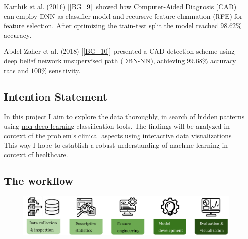 \documentclass[12pt]{article}
\numberwithin{equation}{section}
\begin{document}
\begin{flushleft}
Karthik et al. (2016) [\ref{BG_9}] showed how Computer-Aided Diagnosis (CAD) can employ DNN as classifier model and recursive feature elimination (RFE) for feature selection. After optimizing the train-test split the model reached $98.62 \%$ accuracy. 

Abdel-Zaher et al. (2018) [\ref{BG_10}] presented a CAD detection scheme using deep belief network unsupervised path (DBN-NN), achieving $99.68 \%$ accuracy rate and $100 \%$ sensitivity.


\subsection{Intention Statement}
In this project I aim to explore the data thoroughly, in search of hidden patterns using \underline{non deep learning} classification tools. The findings will be analyzed in context of the problem's clinical aspects using interactive data visualizations. This way I hope to establish a robust understanding of machine learning in context of \underline{healthcare}.

\subsection{The workflow}

\begin{figure}[H]
\centering
\includegraphics[scale=0.45]{pipeline.png}
\end{figure} 

\newpage


\end{flushleft}
\end{document}
